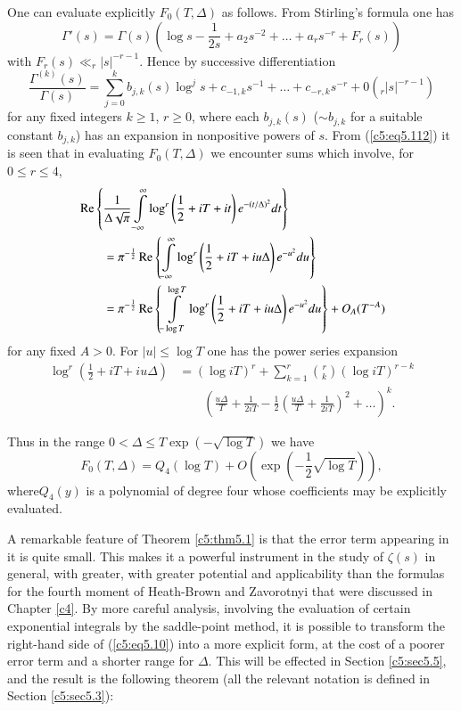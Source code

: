 One can evaluate explicitly $F_0(T,\Delta)$ as follows. From Stirling's formula one has
 $$
 \Gamma' (s)  = \Gamma(s) \left(\log s -\frac{1}{2s} + a_2 s^{-2} + \ldots + a_rs^{-r} + F_r(s)\right)
 $$
 with $F_r(s) \ll_r |s|^{-r-1}$. Hence by successive differentiation
 $$
 \frac{\Gamma^{(k)}(s)}{\Gamma(s)} = \sum\limits^k_{j=0} b_{j,k} (s) \log^j s + c_{-1, k} s^{-1} + \ldots  + c_{-r, k} s^{-r} + 0 \left(_r |s|^{-r-1}\right)
 $$
 for any fixed integers $k \geq 1$, $r \geq 0$, where each $b_{j,k} (s)$ ($\sim b_{j,k}$ for a suitable constant $b_{j,k}$) has an expansion in nonpositive powers of $s$. From (\ref{c5:eq5.112}) it is seen that in evaluating $F_0(T,\Delta)$ we encounter sums which involve, for $0 \leq r \leq 4$,
 \begin{align*}
 & \operatorname{Re} \left\{\frac{1}{\Delta \sqrt{\pi}} \int\limits^\infty_{-\infty}
   \log^r \left(\frac{1}{2} + iT + it \right) e^{-(t/\Delta)^2}
   dt\right\}\\ 
 & \qquad = \pi^{-\frac{1}{2}} \operatorname{Re} \left\{
   \int\limits^\infty_{-\infty} \log^r \left(\frac{1}{2} +iT +
   iu\Delta \right) e^{-u^2} du \right\}\\ 
 & \qquad =  \pi^{-\frac{1}{2}} \operatorname{Re} \left\{  \int\limits^{\log
     T}_{-\log T} \log^r \left(\frac{1}{2} + iT + i u\Delta \right)
   e^{-u^2} du\right\} + O_A(T^{-A}) 
 \end{align*}
 for any fixed $A > 0$. For $|u| \leq \log T$ one has the power series expansion
 \begin{align*}
 \log^r \left(\frac{1}{2} + iT + i u \Delta \right) & = (\log iT)^r +
 \sum\limits^r_{k=1} \binom{r}{k} (\log iT)^{r-k} \\ 
& \qquad \left(\frac{u\Delta}{T} + \frac{1}{2iT} - \frac{1}{2}
 \left(\frac{u\Delta}{T} + \frac{1}{2iT} \right)^2 + \ldots
 \right)^k. 
 \end{align*}

Thus in the range $0 < \Delta \leq T \exp (-\sqrt{\log T}) $ we have 
\begin{equation}
 F_0(T,\Delta) = Q_4 (\log T) + O \left(\exp \left(-\frac{1}{2} \sqrt{\log T } \right) \right), \label{c5:eq5.11}
 \end{equation}
 where\pageoriginale $Q_4(y)$ is a polynomial of degree four whose
 coefficients may be explicitly evaluated. 

 A remarkable feature of Theorem \ref{c5:thm5.1} is that the error
 term appearing in it is quite small. This makes it a powerful
 instrument in the study of $\zeta(s)$  in general, with greater, with
 greater potential and applicability than the formulas for the fourth
 moment of Heath-Brown and Zavorotnyi that were discussed in Chapter
 \ref{c4}. By more careful analysis, involving the evaluation of
 certain exponential integrals by the saddle-point method, it is
 possible to transform the right-hand side of (\ref{c5:eq5.10}) into a
 more explicit form, at the cost of a poorer error term and a shorter
 range for $\Delta$. This will be effected in Section \ref{c5:sec5.5},
 and the result is the following theorem (all the relevant notation is
 defined in Section \ref{c5:sec5.3}): 

